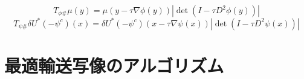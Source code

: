 \begin{equation}
    \label{eq:pushforward Tphi}
    T_{\phi \#} \mu (y) =\mu(y - \tau \nabla \phi(y))|\det (I - \tau D^2 \phi(y))|
\end{equation}
\begin{equation}
    \label{eq:pushforward Tpsi}
    T_{\psi \#} \delta U^* (- \psi^c)(x) =\delta U^* (- \psi^c)(x - \tau \nabla \psi(x))|\det (I - \tau D^2 \psi(x))|
\end{equation}

\section{最適輸送写像のアルゴリズム}